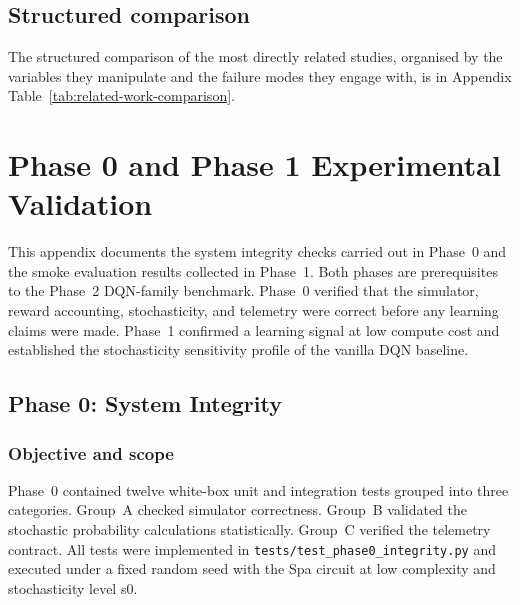 \begin{appendices}
\section{Structured comparison}

The structured comparison of the most directly related studies, organised by the variables they manipulate and the failure modes they engage with, is in Appendix Table~\ref{tab:related-work-comparison}.

\chapter{Phase 0 and Phase 1 Experimental Validation}
\label{appendix:phase01}

This appendix documents the system integrity checks carried out in Phase~0 and the smoke evaluation results collected in Phase~1. Both phases are prerequisites to the Phase~2 DQN-family benchmark. Phase~0 verified that the simulator, reward accounting, stochasticity, and telemetry were correct before any learning claims were made. Phase~1 confirmed a learning signal at low compute cost and established the stochasticity sensitivity profile of the vanilla DQN baseline.



\section{Phase 0: System Integrity}

\subsection{Objective and scope}

Phase~0 contained twelve white-box unit and integration tests grouped into three categories. Group~A checked simulator correctness. Group~B validated the stochastic probability calculations statistically. Group~C verified the telemetry contract. All tests were implemented in \texttt{tests/test\_phase0\_integrity.py} and executed under a fixed random seed with the Spa circuit at low complexity and stochasticity level s0.


\end{appendices}
